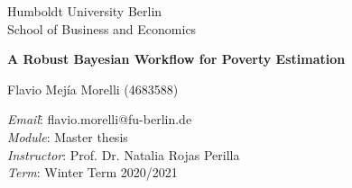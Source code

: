 \thispagestyle{empty}

\begin{center}

\vspace*{19mm}

{\LARGE Humboldt University Berlin}\\
{\LARGE School of Business and Economics\\}



\vspace*{4cm}



\vspace{1cm}

{\Large\textbf{A Robust Bayesian Workflow for Poverty Estimation}}\\ [2mm]

\vspace*{1mm}

\vspace{2.5cm}

{\Large Flavio Mejía Morelli (4683588)}\\[3mm]



\vspace{2cm}
\parbox{120mm}{
\begin{large}
\begin{tabbing}

\textit{Email}:\= \hspace{0.5cm} flavio.morelli@fu-berlin.de\\
\textit{Module}:\> \hspace{0.5cm} Master thesis\\
\textit{Instructor}:\> \hspace{1 cm} Prof. Dr. Natalia Rojas Perilla\\
\textit{Term}:\> Winter Term 2020/2021\\

\end{tabbing}


\end{large}}
\end{center}
